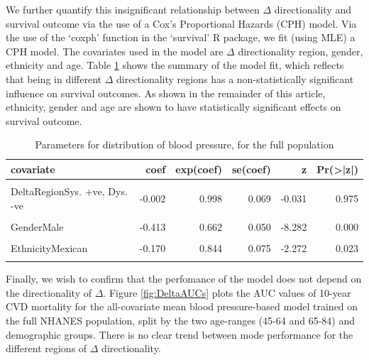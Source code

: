 \documentclass[
]{article}
\begin{document}
We further quantify this insignificant relationship between \(\Delta\) directionality and survival outcome via the use of a Cox's Proportional Hazards (CPH) model. Via the use of the `coxph' function in the `survival' R package, we fit (using MLE) a CPH model. The covariates used in the model are \(\Delta\) directionality region, gender, ethnicity and age. Table \ref{tab:DeltaDir} shows the summary of the model fit, which reflects that being in different \(\Delta\) directionality regions has a non-statistically significant influence on survival outcomes. As shown in the remainder of this article, ethnicity, gender and age are shown to have statistically significant effects on survival outcome.

\begin{table}[!h]

\caption{\label{tab:DeltaDir}Parameters for distribution of blood pressure, for the full population}
\centering
\begin{tabular}[t]{lrrrrr}
\toprule
covariate & coef & exp(coef) & se(coef) & z & Pr(>|z|)\\
\midrule
\cellcolor{gray!6}{DeltaRegionSys. -ve, Dys. +ve} & \cellcolor{gray!6}{0.047} & \cellcolor{gray!6}{1.048} & \cellcolor{gray!6}{0.074} & \cellcolor{gray!6}{0.634} & \cellcolor{gray!6}{0.526}\\
DeltaRegionSys. +ve, Dys. -ve & -0.002 & 0.998 & 0.069 & -0.031 & 0.975\\
\cellcolor{gray!6}{DeltaRegionSys. +ve, Dys. +ve} & \cellcolor{gray!6}{-0.056} & \cellcolor{gray!6}{0.946} & \cellcolor{gray!6}{0.063} & \cellcolor{gray!6}{-0.881} & \cellcolor{gray!6}{0.378}\\
GenderMale & -0.413 & 0.662 & 0.050 & -8.282 & 0.000\\
\cellcolor{gray!6}{EthnicityWhite} & \cellcolor{gray!6}{-0.248} & \cellcolor{gray!6}{0.780} & \cellcolor{gray!6}{0.061} & \cellcolor{gray!6}{-4.043} & \cellcolor{gray!6}{0.000}\\
EthnicityMexican & -0.170 & 0.844 & 0.075 & -2.272 & 0.023\\
\cellcolor{gray!6}{age} & \cellcolor{gray!6}{0.100} & \cellcolor{gray!6}{1.105} & \cellcolor{gray!6}{0.002} & \cellcolor{gray!6}{50.573} & \cellcolor{gray!6}{0.000}\\
\bottomrule
\end{tabular}
\end{table}

Finally, we wish to confirm that the perfomance of the model does not depend on the directionality of \(\Delta\). Figure \ref{fig:DeltaAUCs} plots the AUC values of 10-year CVD mortality for the all-covariate mean blood pressure-based model trained on the full NHANES population, split by the two age-ranges (45-64 and 65-84) and demographic groups. There is no clear trend between mode performance for the different regions of \(\Delta\) directionality.
\end{document}
